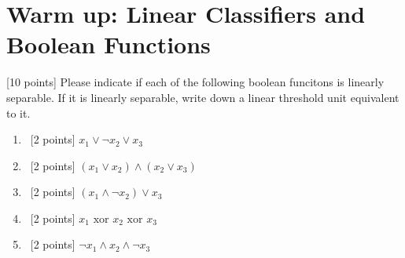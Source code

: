 \section{Warm up: Linear Classifiers and Boolean Functions}\label{sec:q1}

[10 points] Please indicate if each of the following boolean funcitons is linearly separable.
If it is linearly separable, write down a linear threshold unit equivalent to it.

\begin{enumerate}
\item~[2 points] $x_1\vee\neg x_2\vee x_3$

\item~[2 points] $(x_1\vee x_2)\wedge (x_2\vee x_3)$

\item~[2 points] $(x_1\wedge\neg x_2)\vee x_3$

\item~[2 points] $x_1\text{ xor } x_2\text{ xor }x_3$

\item~[2 points] $\neg x_1 \wedge x_2\wedge\neg x_3$
\end{enumerate}

